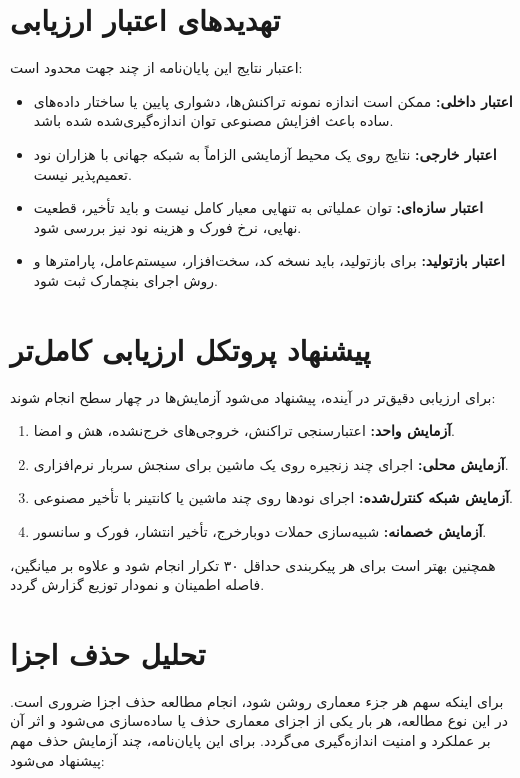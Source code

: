\section{تهدیدهای اعتبار ارزیابی}

اعتبار نتایج این پایان‌نامه از چند جهت محدود است:

\begin{itemize}
\item \textbf{اعتبار داخلی:} ممکن است اندازه نمونه تراکنش‌ها، دشواری پایین یا ساختار داده‌های ساده باعث افزایش مصنوعی توان اندازه‌گیری‌شده شده باشد.
\item \textbf{اعتبار خارجی:} نتایج روی یک محیط آزمایشی الزاماً به شبکه جهانی با هزاران نود تعمیم‌پذیر نیست.
\item \textbf{اعتبار سازه‌ای:} توان عملیاتی به تنهایی معیار کامل نیست و باید تأخیر، قطعیت نهایی، نرخ فورک و هزینه نود نیز بررسی شود.
\item \textbf{اعتبار بازتولید:} برای بازتولید، باید نسخه کد، سخت‌افزار، سیستم‌عامل، پارامترها و روش اجرای بنچمارک ثبت شود.
\end{itemize}

\section{پیشنهاد پروتکل ارزیابی کامل‌تر}

برای ارزیابی دقیق‌تر در آینده، پیشنهاد می‌شود آزمایش‌ها در چهار سطح انجام شوند:

\begin{enumerate}
\item \textbf{آزمایش واحد:} اعتبارسنجی تراکنش، خروجی‌های خرج‌نشده، هش و امضا.
\item \textbf{آزمایش محلی:} اجرای چند زنجیره روی یک ماشین برای سنجش سربار نرم‌افزاری.
\item \textbf{آزمایش شبکه کنترل‌شده:} اجرای نودها روی چند ماشین یا کانتینر با تأخیر مصنوعی.
\item \textbf{آزمایش خصمانه:} شبیه‌سازی حملات دوبارخرج، تأخیر انتشار، فورک و سانسور.
\end{enumerate}

همچنین بهتر است برای هر پیکربندی حداقل ۳۰ تکرار انجام شود و علاوه بر میانگین، فاصله اطمینان و نمودار توزیع گزارش گردد.

\section{تحلیل حذف اجزا}

برای اینکه سهم هر جزء معماری روشن شود، انجام مطالعه حذف اجزا ضروری است. در این نوع مطالعه، هر بار یکی از اجزای معماری حذف یا ساده‌سازی می‌شود و اثر آن بر عملکرد و امنیت اندازه‌گیری می‌گردد. برای این پایان‌نامه، چند آزمایش حذف مهم پیشنهاد می‌شود:

